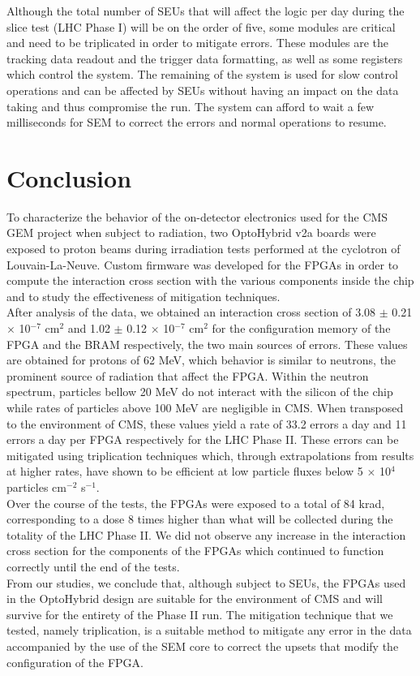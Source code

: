       Although the total number of SEUs that will affect the logic per day during the slice test (LHC Phase I) will be on the order of five, some modules are critical and need to be triplicated in order to mitigate errors. These modules are the tracking data readout and the trigger data formatting, as well as some registers which control the system. The remaining of the system is used for slow control operations and can be affected by SEUs without having an impact on the data taking and thus compromise the run. The system can afford to wait a few milliseconds for SEM to correct the errors and normal operations to resume.

  \section{Conclusion}

    To characterize the behavior of the on-detector electronics used for the CMS GEM project when subject to radiation, two OptoHybrid v2a boards were exposed to proton beams during irradiation tests performed at the cyclotron of Louvain-La-Neuve. Custom firmware was developed for the FPGAs in order to compute the interaction cross section with the various components inside the chip and to study the effectiveness of mitigation techniques.  \\

    After analysis of the data, we obtained an interaction cross section of 3.08 $\pm$ 0.21 $ \times $ 10$^{-7}$ cm$^2$ and 1.02 $\pm$ 0.12 $ \times $ 10$^{-7}$ cm$^2$ for the configuration memory of the FPGA and the BRAM respectively, the two main sources of errors. These values are obtained for protons of 62 MeV, which behavior is similar to neutrons, the prominent source of radiation that affect the FPGA. Within the neutron spectrum, particles bellow 20 MeV do not interact with the silicon of the chip while rates of particles above 100 MeV are negligible in CMS. When transposed to the environment of CMS, these values yield a rate of 33.2 errors a day and 11 errors a day per FPGA respectively for the LHC Phase II. These errors can be mitigated using triplication techniques which, through extrapolations from results at higher rates, have shown to be efficient at low particle fluxes below 5 $ \times $ 10$^4$ particles cm$^{-2}$ s$^{-1}$. \\

    Over the course of the tests, the FPGAs were exposed to a total of 84 krad, corresponding to a dose 8 times higher than what will be collected during the totality of the LHC Phase II. We did not observe any increase in the interaction cross section for the components of the FPGAs which continued to function correctly until the end of the tests. \\

    From our studies, we conclude that, although subject to SEUs, the FPGAs used in the OptoHybrid design are suitable for the environment of CMS and will survive for the entirety of the Phase II run. The mitigation technique that we tested, namely triplication, is a suitable method to mitigate any error in the data accompanied by the use of the SEM core to correct the upsets that modify the configuration of the FPGA.
